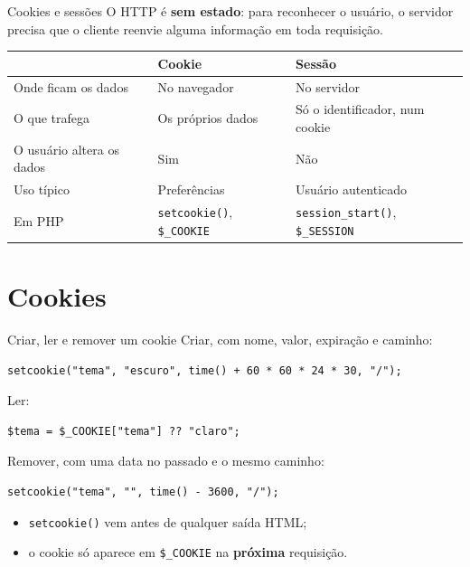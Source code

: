 \documentclass{beamer}
\begin{document}
\begin{frame}{Cookies e sessões}
	O HTTP é \textbf{sem estado}: para reconhecer o usuário, o servidor precisa
	que o cliente reenvie alguma informação em toda requisição.

	\vspace{0.3cm}
	\small
	\begin{tabular}{p{} p{} p{}}
		\toprule
		 & \textbf{Cookie} & \textbf{Sessão} \\ \midrule
		Onde ficam os dados & No navegador & No servidor \\
		O que trafega & Os próprios dados & Só o identificador, num cookie \\
		O usuário altera os dados & Sim & Não \\
		Uso típico & Preferências & Usuário autenticado \\
		Em PHP & \texttt{setcookie()}, \texttt{\$\_COOKIE} &
		\texttt{session\_start()}, \texttt{\$\_SESSION} \\
		\bottomrule
	\end{tabular}
\end{frame}

\section{Cookies}

\begin{frame}[fragile]{Criar, ler e remover um cookie}
	Criar, com nome, valor, expiração e caminho:
	\begin{verbatim}
setcookie("tema", "escuro", time() + 60 * 60 * 24 * 30, "/");
	\end{verbatim}

	Ler:
	\begin{verbatim}
$tema = $_COOKIE["tema"] ?? "claro";
	\end{verbatim}

	Remover, com uma data no passado e o mesmo caminho:
	\begin{verbatim}
setcookie("tema", "", time() - 3600, "/");
	\end{verbatim}

	\begin{itemize}
		\item \texttt{setcookie()} vem antes de qualquer saída HTML;
		\item o cookie só aparece em \texttt{\$\_COOKIE} na \textbf{próxima}
		      requisição.
	\end{itemize}
\end{frame}
\end{document}
